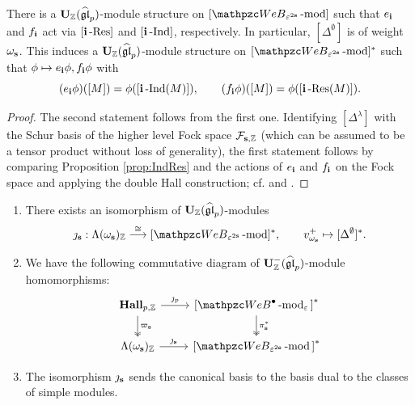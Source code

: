 \begin{proposition} 
  \label{prop:lieaction}
There is a $\bold{U}_{\mathbb{Z}}(\widehat{\mathfrak {gl}}_p)$-module structure on $[\qW_{\eps^{2\bfs}}\modf]$ such that $e_{\mathbf{i}}$ and $f_{\mathbf{i}}$ act via  $[\mathbf{i}\operatorname{-Res}\nolimits]$ and $[\mathbf{i}\operatorname{-Ind}\nolimits]$, respectively.
In particular, $[\Delta^\emptyset]$ is of weight $\omega_{\mathbf{s}}$.  This induces a $\bold{U}_{\mathbb{Z}}(\widehat{\mathfrak {gl}}_p)$-module structure on $[\qW_{\eps^{2\bfs}}\modf]^*$ such that %
$\phi\mapsto e_{\mathbf{i}}\phi, f_{\mathbf{i}}\phi$ with
\[ 
(e_{\mathbf{i}} \phi) ([M])=\phi ([\mathbf{i}\operatorname{-Ind}\nolimits(M)]), \qquad
(f_{\mathbf{i}}\phi) ([M])=\phi([\mathbf{i}\operatorname{-Res}\nolimits(M)]). 
\]
\end{proposition}

\begin{proof}
    The second statement follows from the first one. Identifying $[\Delta^\lambda]$ with the Schur basis of the higher level Fock space $\mathcal{F}_{\mathbf{s},\mathbb{Z}}$ (which can be assumed to be a tensor product without loss of generality), the first statement follows by comparing  Proposition \ref{prop:IndRes} and the actions of $e_{\mathbf{i}}$ and $f_{\mathbf{i}}$ on the Fock space  and applying the double Hall construction; cf. \cite[\S 6.2]{VV99} and \cite{X97}.
\end{proof}


\begin{theorem}  \label{thm:cyc_cat}
\begin{enumerate}
    \item 
There exists an isomorphism of $\bold{U}_{\mathbb{Z}}(\widehat{\mathfrak {gl}}_p)$-modules
\[
\jmath_\bfs: \Lambda (\omega_\bfs)_\Z   \stackrel{\cong}{\longrightarrow}  [\qW_{\eps^{2\bfs}} \modf]^*, \qquad v^+_{\omega_\bfs}\mapsto[\Delta^\emptyset]^*.
\]
\item
We have the following commutative diagram of $\bold{U}_{\mathbb{Z}}^-(\widehat{\mathfrak{gl}}_p)$-module homomorphisms: 
\begin{equation}  
\label{CD:cat}
\begin{tikzcd}
\HallZ \ar[r,"\jmath_p"]\ar[d,two heads,"\varpi_\bfs"]&{[}\qAW \modf_\eps{]}^* \ar[d,two heads,"\pi_\bfs^*"]\\
\Lambda (\omega_\bfs)_\Z  \ar[r,"\jmath_\bfs"]&{[}\qW_{\eps^{2\bfs}} \modf{]}^* 
\end{tikzcd} 
\end{equation}
\item
 The isomorphism $\jmath_{\mathbf{s}}$ sends the canonical basis to the basis dual to the classes of simple modules. 
 \end{enumerate}
\end{theorem}

